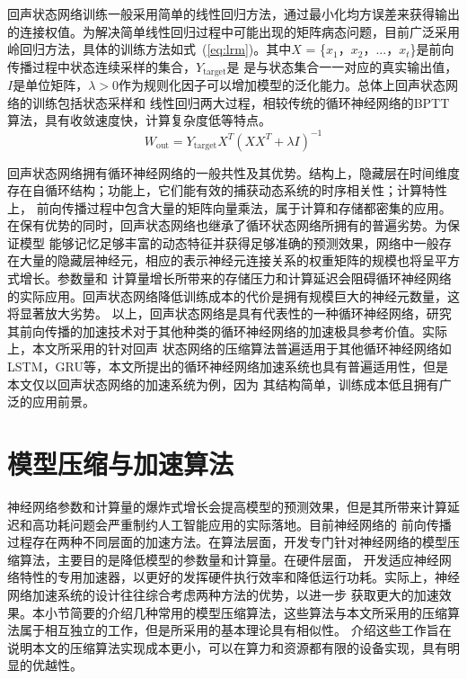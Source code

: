 回声状态网络训练一般采用简单的线性回归方法，通过最小化均方误差来获得输出的连接权值。为解决简单线性回归过程中可能出现的矩阵病态问题，目前广泛采用
岭回归方法，具体的训练方法如式~(\ref{eq:lrm})。其中\(X\) = \{\(x_1\)，\(x_2\)，...，\(x_t\)\}是前向传播过程中状态连续采样的集合，\(Y_{\mathrm{target}}\)是
是与状态集合一一对应的真实输出值，\(I\)是单位矩阵，\( \lambda > 0\)作为规则化因子可以增加模型的泛化能力。总体上回声状态网络的训练包括状态采样和
线性回归两大过程，相较传统的循环神经网络的BPTT算法，具有收敛速度快，计算复杂度低等特点。
\begin{equation}\label{eq:lrm}
	W_{\mathrm{out}} = Y_{\mathrm{target}} X^{T}(XX^{T} + \lambda I)^{-1}
\end{equation}

回声状态网络拥有循环神经网络的一般共性及其优势。结构上，隐藏层在时间维度存在自循环结构；功能上，它们能有效的捕获动态系统的时序相关性；计算特性上，
前向传播过程中包含大量的矩阵向量乘法，属于计算和存储都密集的应用。在保有优势的同时，回声状态网络也继承了循环状态网络所拥有的普遍劣势。为保证模型
能够记忆足够丰富的动态特征并获得足够准确的预测效果，网络中一般存在大量的隐藏层神经元，相应的表示神经元连接关系的权重矩阵的规模也将呈平方式增长。参数量和
计算量增长所带来的存储压力和计算延迟会阻碍循环神经网络的实际应用。回声状态网络降低训练成本的代价是拥有规模巨大的神经元数量，这将显著放大劣势。
以上，回声状态网络是具有代表性的一种循环神经网络，研究其前向传播的加速技术对于其他种类的循环神经网络的加速极具参考价值。实际上，本文所采用的针对回声
状态网络的压缩算法普遍适用于其他循环神经网络如LSTM，GRU等，本文所提出的循环神经网络加速系统也具有普遍适用性，但是本文仅以回声状态网络的加速系统为例，因为
其结构简单，训练成本低且拥有广泛的应用前景。
\section{模型压缩与加速算法}
神经网络参数和计算量的爆炸式增长会提高模型的预测效果，但是其所带来计算延迟和高功耗问题会严重制约人工智能应用的实际落地。目前神经网络的
前向传播过程存在两种不同层面的加速方法。在算法层面，开发专门针对神经网络的模型压缩算法，主要目的是降低模型的参数量和计算量。在硬件层面，
开发适应神经网络特性的专用加速器，以更好的发挥硬件执行效率和降低运行功耗。实际上，神经网络加速系统的设计往往综合考虑两种方法的优势，以进一步
获取更大的加速效果。本小节简要的介绍几种常用的模型压缩算法，这些算法与本文所采用的压缩算法属于相互独立的工作，但是所采用的基本理论具有相似性。
介绍这些工作旨在说明本文的压缩算法实现成本更小，可以在算力和资源都有限的设备实现，具有明显的优越性。

